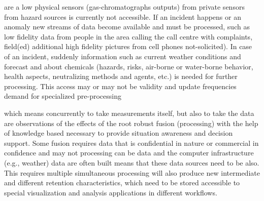\documentclass[times]{cpeauth}
\begin{document}
are %
a low %
physical sensors %
(gas-chromatographs outputs) %
from private sensors from hazard sources is %
currently not accessible. If an incident happens or an anomaly %
new streams of data become available and must be processed, such as low %
fidelity data from people in the area calling the call centre with complaints,
field(ed) %
additional high fidelity %
pictures from cell phones %
not-solicited). In case of an incident, suddenly %
information such as current weather conditions and forecast and %
about chemicals (hazards, risks, air-borne or water-borne behavior, health %
aspects, neutralizing methods and agents, etc.) is needed for further
processing. This %
access may or may not be %
validity and update frequencies %
demand for specialized pre-processing %


which means %
concurrently to take %
measurements itself, but also to take %
the data are observations of the effects of the root %
robust fusion (processing) with the help of knowledge based %
necessary to provide situation awareness and decision support. Some fusion %
requires data that is confidential in nature or commercial in confidence and may
not %
processing %
can be %
data and the %
computer infrastructure %
(e.g., weather) data are often built %
means that these data sources need to be %
also. This requires multiple simultaneous %
processing will also produce new intermediate and %
different retention characteristics, which need to be stored %
accessible to special visualization and analysis applications in different %
workflows.
\end{document}
